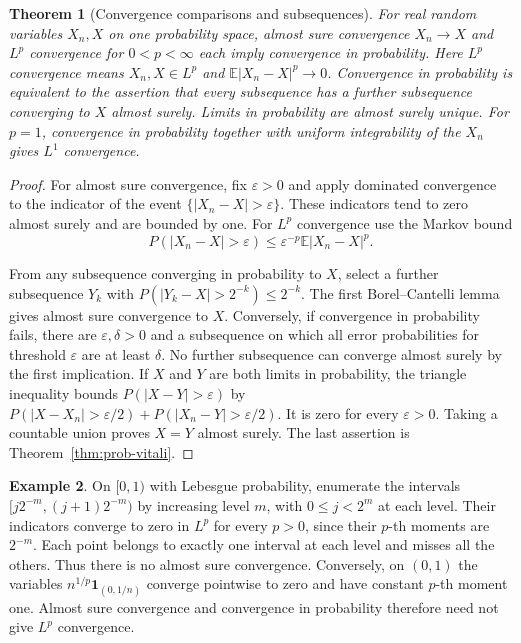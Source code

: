 \documentclass[11pt,oneside,openany]{book}
\theoremstyle{plain}
\newtheorem{theorem}{Theorem}[chapter]
\theoremstyle{definition}
\newtheorem{example}[theorem]{Example}
\theoremstyle{remark}
\begin{document}
\begin{theorem}[Convergence comparisons and subsequences]
\label{thm:prob-convergence-modes}
For real random variables \(X_n,X\) on one probability space, almost
sure convergence \(X_n\to X\) and \(L^p\) convergence for \(0<p<\infty\)
each imply convergence in probability. Here \(L^p\) convergence means
\(X_n,X\in L^p\) and \(\mathbb E|X_n-X|^p\to0\).
Convergence in probability is equivalent to the assertion that
every subsequence has a further subsequence converging to \(X\)
almost surely. Limits in probability are almost surely unique.
For \(p=1\), convergence in probability together with uniform
integrability of the \(X_n\) gives \(L^1\) convergence.
\end{theorem}
\begin{proof}
For almost sure convergence, fix \(\varepsilon>0\) and apply
dominated convergence to the indicator of the event
\(\{|X_n-X|>\varepsilon\}\). These indicators tend to zero almost surely
and are bounded by one. For \(L^p\) convergence use the Markov bound
\[
 P(|X_n-X|>\varepsilon)\le\varepsilon^{-p}\mathbb E|X_n-X|^p.
\]

From any subsequence converging in probability to \(X\), select a
further subsequence \(Y_k\) with
\(P(|Y_k-X|>2^{-k})\le 2^{-k}\). The first Borel--Cantelli lemma
gives almost sure convergence to \(X\). Conversely, if convergence
in probability fails, there are \(\varepsilon,\delta>0\) and a
subsequence on which all error probabilities for threshold
\(\varepsilon\) are at least \(\delta\). No further subsequence
can converge almost surely by the first implication. If \(X\) and
\(Y\) are both limits in probability, the triangle inequality
bounds \(P(|X-Y|>\varepsilon)\) by
\(P(|X-X_n|>\varepsilon/2)+P(|X_n-Y|>\varepsilon/2)\).
It is zero for every \(\varepsilon>0\). Taking a countable union
proves \(X=Y\) almost surely. The last assertion is
Theorem~\ref{thm:prob-vitali}.
\end{proof}

\begin{example}
On \([0,1)\) with Lebesgue probability, enumerate the intervals
\([j2^{-m},(j+1)2^{-m})\) by increasing level \(m\), with
\(0\le j<2^m\) at each level. Their indicators converge to zero in
\(L^p\) for every \(p>0\), since their \(p\)-th moments are \(2^{-m}\).
Each point belongs to exactly one interval at each level and
misses all the others. Thus there is no almost sure convergence.
Conversely, on \((0,1)\) the variables \(n^{1/p}\mathbf
1_{(0,1/n)}\) converge pointwise to zero and have constant \(p\)-th
moment one. Almost sure convergence and convergence in probability
therefore need not give \(L^p\) convergence.
\end{example}
\end{document}
